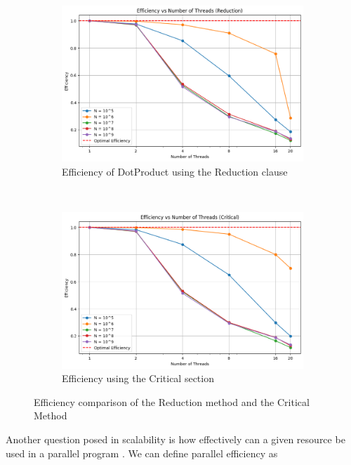 \begin{figure}[H]
    \centering
    \begin{subfigure}[b]{\textwidth}
        \centering
        \includegraphics[width=\textwidth]{../media/eff_red.png}
        \caption{Efficiency of DotProduct using the Reduction clause}
        \label{fig:image1}
    \end{subfigure}
    \hfill \\
    \begin{subfigure}[b]{\textwidth}
        \centering
        \includegraphics[width=\textwidth]{../media/eff_crit.png}
        \caption{Efficiency using the Critical section}
        \label{fig:image2}
    \end{subfigure}
    \caption{Efficiency comparison of the Reduction method and the Critical Method}
    \label{fig:eff}
\end{figure}
\newpage
Another question posed in scalability is how effectively can a given resource be used in a parallel program \cite{hager_introduction_2010}. We can define parallel efficiency as 
